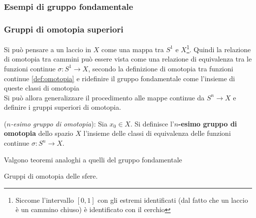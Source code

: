 \subsubsection{Esempi di gruppo fondamentale}
\subsubsection{Gruppi di omotopia superiori}
Si può pensare a un laccio in $X$ come una mappa tra $S^1$ e $X$\footnote{
Siccome l'intervallo $[0,1]$ con gli estremi identificati
(dal fatto che un laccio è un cammino chiuso) è identificato con il cerchio}.
Quindi la relazione di omotopia tra cammini può essere vista come una relazione
di equivalenza tra le funzioni continue $\sigma : S^1 \to X$, secondo la definizione
di omotopia tra funzioni continue \ref{def:omotopia} e ridefinire
il gruppo fondamentale come l'insieme di queste classi di omotopia\\

Si può allora generalizzare il procedimento alle mappe continue da $S^n \to X$ e
definire i gruppi superiori di omotopia.

\begin{definition}(\emph{$n$-esimo gruppo di omotopia}):
   Sia $x_0 \in X$. Si definisce l'\textbf{$n$-esimo gruppo di omotopia}
   dello spazio $X$ l'insieme delle classi di equivalenza delle funzioni continue
   $\sigma : S^n \to X$.
\end{definition}

Valgono teoremi analoghi a quelli del gruppo fondamentale

Gruppi di omotopia delle sfere.

